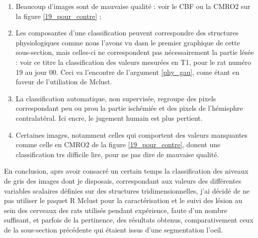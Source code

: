 \begin{enumerate}[label=\textbf{(Contre\arabic*)}]
\item Beaucoup d'images sont de mauvaise qualit\'e : voir le CBF ou la CMRO2 sur la figure \ref{19_pour_contre} ;
%
\item Les composantes d'une classification peuvent correspondre  des structures physiologiques comme nous l'avons vu dasn le premier graphique de cette sous-section, %
mais celles-ci ne correspondent pas n\'ecessairement  la partie l\'es\'ee : %
voir  ce titre la classification des valeurs mesur\'ees en T1, pour le rat num\'ero 19 au jour 00. %
Ceci va  l'encontre de l'argument \ref{phy_gau}, come \'etant en faveur de l'utiliation de Mclust.
%
\item La classification automatique, non supervis\'ee, regroupe des pixels correspondant peu ou prou  la partie isch\'emi\'ee et des pixels de l'h\'emisphre contralat\'eral. %
Ici encre, le jugement humain est plus pertient.
%
\item Certaines images, notamment celles qui comportent des valeurs manquantes comme celle en CMRO2 de la figure \ref{19_pour_contre}, %
donent une classification trs difficile  lire, pour ne pas dire de mauvaise qualit\'e.
\end{enumerate}







\ligneinter
En conclusion, aprs avoir consacr\'e un certain temps  la classification des niveaux de gris des images dont je disposais, %
correspondant aux valeurs des diff\'erentes variables scalaires d\'efinies sur des structures tridimensionnelles, %
j'ai d\'ecid\'e de ne pas utiliser le paquet R Mclust pour la caract\'erisation et le suivi des l\'esion au sein des cerveaux des rats utilis\'es pendant exp\'erience, %
faute d'un nombre suffisant, et parfois de la pertinence, des r\'esultats obtenus, %
comparativement  ceux de la sous-section pr\'ec\'edente qui \'etaient issus d'une segmentation  l'oeil.

